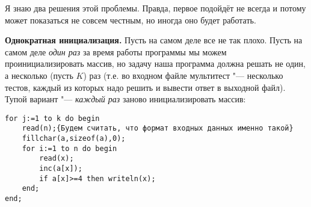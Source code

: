 
Я знаю два решения этой проблемы. Правда, первое подойдёт не всегда и потому может показаться не 
совсем честным, но иногда оно будет работать.

\textbf{Однократная инициализация.} Пусть на самом деле все не так плохо. Пусть на самом деле 
\textit{один раз} за время работы программы мы можем проинициализировать массив, но задачу наша 
программа должна решать не один, а несколько (пусть $K$) раз (т.е. во входном файле мультитест "--- несколько тестов, каждый из которых надо решить и вывести ответ в выходной файл). Тупой вариант "--- \textit{каждый раз} 
заново инициализировать массив:
\begin{codesampleo}\begin{verbatim}
for j:=1 to k do begin
    read(n);{Будем считать, что формат входных данных именно такой}
    fillchar(a,sizeof(a),0);
    for i:=1 to n do begin
        read(x);
        inc(a[x]);
        if a[x]>=4 then writeln(x);
    end;
end;
\end{verbatim}
\end{codesampleo}


